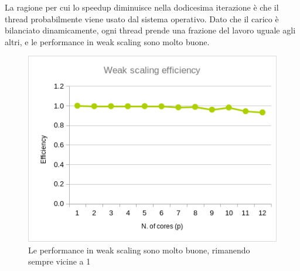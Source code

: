 \documentclass[a4paper,11pt, twoside]{report}
\begin{document}
La ragione per cui lo speedup diminuisce nella dodicesima iterazione è che il thread probabilmente viene usato dal sistema operativo.
Dato che il carico è bilanciato dinamicamente, ogni thread prende una frazione del lavoro uguale agli altri, 
e le performance in weak scaling sono molto buone.
\begin{figure}
    \includegraphics[scale=0.5]{images/omp_weak.png}
    \caption[]{Le performance in weak scaling sono molto buone, rimanendo sempre vicine a 1}
\end{figure}
\end{document}
